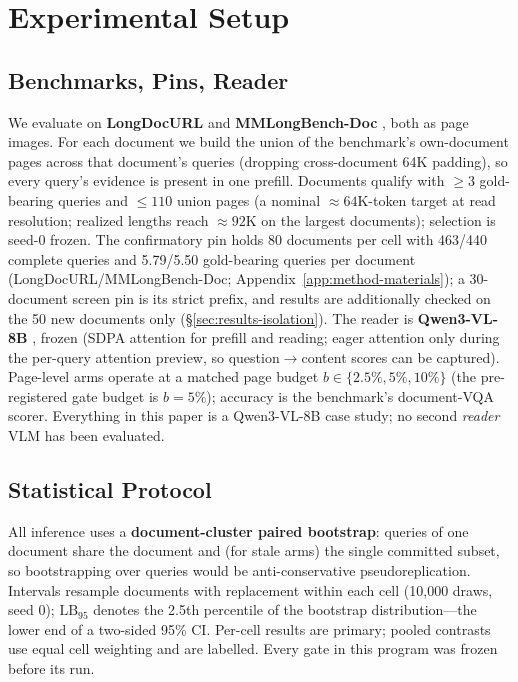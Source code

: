 \documentclass[letterpaper]{article} %
\newcommand{\lb}{\mathrm{LB}_{95}}
\begin{document}
\section{Experimental Setup}\label{sec:setup}

\subsection{Benchmarks, Pins, Reader}
We evaluate on \textbf{LongDocURL} \citep{deng2025longdocurl} and \textbf{MMLongBench-Doc} \citep{ma2024mmlongbench}, both as page images. For each document we build the union of the benchmark's own-document pages across that document's queries (dropping cross-document 64K padding), so every query's evidence is present in one prefill. Documents qualify with $\geq 3$ gold-bearing queries and $\leq 110$ union pages (a nominal ${\approx}64$K-token target at read resolution; realized lengths reach ${\approx}92$K on the largest documents); selection is seed-0 frozen. The confirmatory pin holds 80 documents per cell with 463/440 complete queries and 5.79/5.50 gold-bearing queries per document (LongDocURL/MMLongBench-Doc; Appendix~\ref{app:method-materials}); a 30-document screen pin is its strict prefix, and results are additionally checked on the 50 new documents only (\S\ref{sec:results-isolation}). The reader is \textbf{Qwen3-VL-8B} \citep{qwen3vl2025}, frozen (SDPA attention for prefill and reading; eager attention only during the per-query attention preview, so question$\to$content scores can be captured). Page-level arms operate at a matched page budget $b \in \{2.5\%, 5\%, 10\%\}$ (the pre-registered gate budget is $b=5\%$); accuracy is the benchmark's document-VQA scorer. Everything in this paper is a Qwen3-VL-8B case study; no second \emph{reader} VLM has been evaluated.

\subsection{Statistical Protocol}\label{sec:setup-stats}
All inference uses a \textbf{document-cluster paired bootstrap}: queries of one document share the document and (for stale arms) the single committed subset, so bootstrapping over queries would be anti-conservative pseudoreplication. Intervals resample documents with replacement within each cell (10{,}000 draws, seed 0); $\lb$ denotes the 2.5th percentile of the bootstrap distribution---the lower end of a two-sided 95\% CI. Per-cell results are primary; pooled contrasts use equal cell weighting and are labelled. Every gate in this program was frozen before its run.
\end{document}
